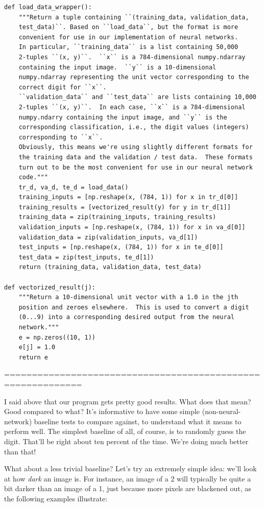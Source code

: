 \begin{lstlisting}
def load_data_wrapper():
    """Return a tuple containing ``(training_data, validation_data,
    test_data)``. Based on ``load_data``, but the format is more
    convenient for use in our implementation of neural networks.
    In particular, ``training_data`` is a list containing 50,000
    2-tuples ``(x, y)``.  ``x`` is a 784-dimensional numpy.ndarray
    containing the input image.  ``y`` is a 10-dimensional
    numpy.ndarray representing the unit vector corresponding to the
    correct digit for ``x``.
    ``validation_data`` and ``test_data`` are lists containing 10,000
    2-tuples ``(x, y)``.  In each case, ``x`` is a 784-dimensional
    numpy.ndarry containing the input image, and ``y`` is the
    corresponding classification, i.e., the digit values (integers)
    corresponding to ``x``.
    Obviously, this means we're using slightly different formats for
    the training data and the validation / test data.  These formats
    turn out to be the most convenient for use in our neural network
    code."""
    tr_d, va_d, te_d = load_data()
    training_inputs = [np.reshape(x, (784, 1)) for x in tr_d[0]]
    training_results = [vectorized_result(y) for y in tr_d[1]]
    training_data = zip(training_inputs, training_results)
    validation_inputs = [np.reshape(x, (784, 1)) for x in va_d[0]]
    validation_data = zip(validation_inputs, va_d[1])
    test_inputs = [np.reshape(x, (784, 1)) for x in te_d[0]]
    test_data = zip(test_inputs, te_d[1])
    return (training_data, validation_data, test_data)

def vectorized_result(j):
    """Return a 10-dimensional unit vector with a 1.0 in the jth
    position and zeroes elsewhere.  This is used to convert a digit
    (0...9) into a corresponding desired output from the neural
    network."""
    e = np.zeros((10, 1))
    e[j] = 1.0
    return e
\end{lstlisting}

 ============================================================

I said above that our program gets pretty good results. What does that mean? Good compared to what? It's informative to have some simple (non-neural-network) baseline tests to compare against, to understand what it means to perform well. The simplest baseline of all, of course, is to randomly guess the digit. That'll be right about ten percent of the time. We're doing much better than that!

What about a less trivial baseline? Let's try an extremely simple idea: we'll look at how \textit{dark} an image is. For instance, an image of a 2 will typically be quite a bit darker than an image of a 1, just because more pixels are blackened out, as the following examples illustrate:

